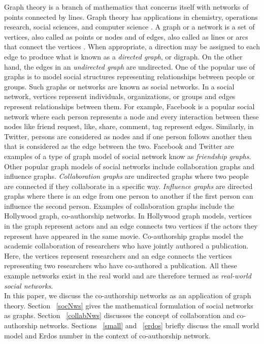 \documentclass[12pt]{article}
\theoremstyle{definition}
\begin{document}
Graph theory is a branch of mathematics that concerns itself with networks of points connected by lines. Graph theory has applications in chemistry, operations research, social sciences, and computer science \cite{Carlson20}. A graph or a network is a set of vertices, also called as points or nodes and of edges, also called as lines or arcs that connect the vertices \cite{Carlson20}. When appropriate, a direction may be assigned to each edge to produce what is known as a \textit{directed graph}, or digraph. On the other hand, the edges in an \textit{undirected graph} are undirected. One of the popular use of graphs is to model social structures representing relationships between people or groups. Such graphs or networks are known as social networks. In a social network, vertices represent individuals, organizations, or groups and edges represent relationships between them. For example, Facebook is a popular social network where each person represents a node and every interaction between these nodes like friend request, like, share, comment, tag represent edges. Similarly, in Twitter, persons are considered as nodes and if one person follows another then that is considered as the edge between the two. Facebook and Twitter are examples of a type of graph model of social network know as \textit{friendship graphs}. Other popular graph models of social networks include collaboration graphs and influence graphs. \textit{Collaboration graphs} are undirected graphs where two people are connected if they collaborate in a specific way. \textit{Influence graphs} are directed graphs where there is an edge from one person to another if the first person can influence the second person. Examples of collaboration graphs include the Hollywood graph, co-authorship networks. In Hollywood graph models, vertices in the graph represent actors and an edge connects two vertices if the actors they represent have appeared in the same movie. Co-authorship graphs model the academic collaboration of researchers who have jointly authored a publication. Here, the vertices represent researchers and an edge connects the vertices representing two researchers who have co-authored a publication. All these example networks exist in the real world and are therefore termed as \textit{real-world social networks}. \\

In this paper, we discuss the co-authorship networks as an application of graph theory. Section ~\ref{socNws} gives the mathematical formulation of social networks as graphs. Section ~\ref{collabNws} discusses the concept of collaboration and co-authorship networks. Sections ~\ref{small} and ~\ref{erdos} briefly discuss the small world model and Erdos number in the context of co-authorship network.
\end{document}
